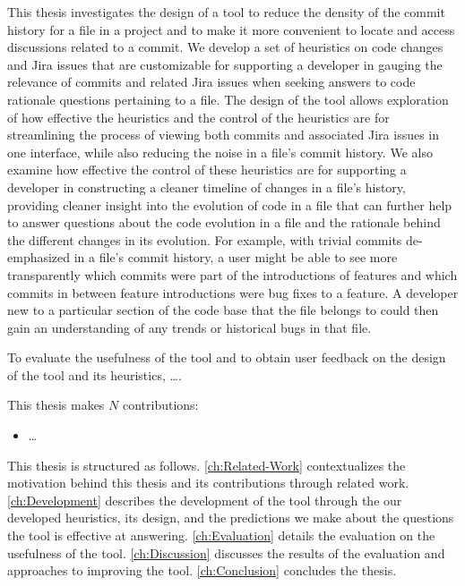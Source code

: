 This thesis investigates the design of a tool to reduce the density of the commit history for a file in a project and to make it more convenient to locate and access discussions related to a commit. 
We develop a set of heuristics on code changes and Jira issues that are customizable for supporting a developer in gauging the relevance of commits and related Jira issues when seeking answers to code rationale questions pertaining to a file.
The design of the tool allows exploration of how effective the heuristics and the control of the heuristics are for streamlining the process of viewing both commits and associated Jira issues in one interface, while also reducing the noise in a file's commit history.
We also examine how effective the control of these heuristics are for supporting a developer in constructing a cleaner timeline of changes in a file's history, providing cleaner insight into the evolution of code in a file that can further help to answer questions about the code evolution in a file and the rationale behind the different changes in its evolution. 
For example, with trivial commits de-emphasized in a file's commit history, a user might be able to see more transparently which commits were part of the introductions of features and which commits in between feature introductions were bug fixes to a feature.
A developer new to a particular section of the code base that the file belongs to could then gain an understanding of any trends or historical bugs in that file.

To evaluate the usefulness of the tool and to obtain user feedback on the design of the tool and its heuristics, \dots .

This thesis makes $N$ contributions:
\begin{itemize}
	\item \dots
\end{itemize}

This thesis is structured as follows. 
\autoref{ch:Related-Work} contextualizes the motivation behind this thesis and its contributions through related work. 
\autoref{ch:Development} describes the development of the tool through the our developed heuristics, its design, and the predictions we make about the questions the tool is effective at answering. \autoref{ch:Evaluation} details the evaluation on the usefulness of the tool.
\autoref{ch:Discussion} discusses the results of the evaluation and approaches to improving the tool.
\autoref{ch:Conclusion} concludes the thesis.

\endinput

Any text after an \endinput is ignored.
You could put scraps here or things in progress.
